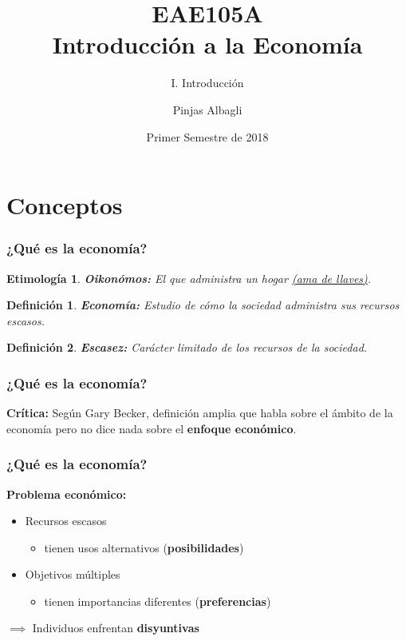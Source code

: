 \documentclass[dvipsnames,table]{beamer}
\title{EAE105A \\ Introducción a la Economía}
\subtitle{I. Introducción}
\author{Pinjas Albagli}
\institute{Instituto de Economía \\ Pontificia Universidad Católica de Chile}
\date{Primer Semestre de 2018}
\newtheorem{mydef}{Definición}
\newtheorem{etim}{Etimología}
\begin{document}
	\maketitle 
	
	\section{Conceptos}

		\begin{frame}
			\frametitle{¿Qué es la economía?}
			\begin{etim}
			\textbf{Oikonómos:} El que administra un hogar \href{https://translate.google.es/\#el/es/\%CE\%BF\%CE\%B9\%CE\%BA\%CE\%BF\%CE\%BD\%CF\%8C\%CE\%BC\%CE\%BF\%CF\%82}{(ama de llaves)}.
			\end{etim}
			\begin{mydef}
			\textbf{Economía:} Estudio de cómo la sociedad administra sus recursos escasos.
			\end{mydef}
			\begin{mydef}
				\textbf{Escasez:} Carácter limitado de los recursos de la sociedad.
			\end{mydef}
		\end{frame}

		\begin{frame}
			\frametitle{¿Qué es la economía?}
			\textbf{Crítica:} Según Gary Becker, definición amplia que habla sobre el ámbito de la economía pero no dice nada sobre el \textbf{enfoque económico}.
		\end{frame}

		\begin{frame}
			\frametitle{¿Qué es la economía?}
			\textbf{Problema económico:}
			\begin{itemize}
				\item Recursos escasos
				\begin{itemize}
					\item tienen usos alternativos (\textbf{posibilidades})
				\end{itemize}
				\item Objetivos múltiples
				\begin{itemize}
					\item tienen importancias diferentes (\textbf{preferencias})
				\end{itemize}
			\end{itemize}
			\vspace{.4cm}
			$\implies$ Individuos enfrentan \textbf{disyuntivas}
		\end{frame}
\end{document}
